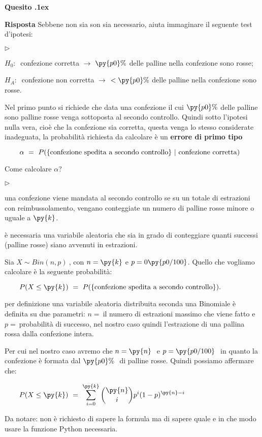 \documentclass[11pt,twoside,a4paper]{article}
\newcommand{\mylabel}[1]{#1\hfill}
\renewenvironment{itemize}
  {\begin{list}{$\triangleright$}{%
   \setlength{\parskip}{0mm}
   \setlength{\topsep}{.4\baselineskip}
   \setlength{\rightmargin}{0mm}
   \setlength{\listparindent}{0mm}
   \setlength{\itemindent}{0mm}
   \setlength{\labelwidth}{2ex}
   \setlength{\itemsep}{.4\baselineskip}
   \setlength{\parsep}{0mm}
   \setlength{\partopsep}{0mm}
   \setlength{\labelsep}{1ex}
   \setlength{\leftmargin}{\labelwidth+\labelsep}
   \let\makelabel\mylabel}}{%
   \end{list}\vspace*{-1.3mm}}
\newcounter{quesito}
\newenvironment{question}{\addtocounter{quesito}{1}\par\textbf{Quesito \thequesito.\kern1ex}}{\vspace{0.5\parskip}}
\newenvironment{answer}{\par\textbf{Risposta\quad}}{\vspace{\parskip}}
\begin{document}
\begin{question}
\begin{answer}
Sebbene non sia son sia necessario, aiuta immaginare il seguente test d'ipotesi:
\begin{itemize}
\item $H_0:\ $ confezione corretta $\rightarrow$ $\py{p0}\%$ delle palline nella confezione sono rosse;
\item $H_A:\ $ confezione non corretta $\rightarrow$ $< \py{p0}\%$ delle palline nella confezione sono rosse.
\end{itemize} 
Nel primo punto si richiede che data una confezione il cui $\py{p0} \% $ delle palline sono palline rosse  venga sottoposta al secondo controllo. Quindi sotto l'ipotesi nulla vera, cioè che la confezione sia corretta, questa venga lo stesso considerate inadeguata, la probabilità richiesta da calcolare è un \textbf{errore di primo tipo}

$\qquad
\alpha\ =\ P(\{{\rm confezione\ spedita\ a\ secondo\ controllo}\}\ | {\rm\ confezione\ corretta})
$

Come calcolare $\alpha$? 
\begin{itemize}
\item una confezione viene mandata al secondo controllo se su un totale di  estrazioni con reimbussolamento, vengano conteggiate un numero di palline rosse minore o uguale a $\py{k}$.
\item è necessaria una variabile aleatoria che sia in grado di conteggiare quanti successi (palline rosse) siano avvenuti in  estrazioni.
\item Sia $X\sim Bin(n,p)\ $, con $n=\py{k}$ e $p=0\py{p0/100}$. Quello che vogliamo calcolare è la seguente probabilità:

$\qquad
P(X\le \py{k})\ =\ P(\{\rm confezione\ spedita\ a\ secondo\ controllo\}).
$

\item per definizione una variabile aleatoria distribuita seconda una Binomiale è definita su due parametri: $n=\ $il numero di estrazioni massimo che viene fatto e $p=\ $probabilità di successo, nel nostro caso quindi l'estrazione di una pallina rossa dalla confezione intera. 
\end{itemize}
Per cui nel nostro caso avremo che $n=\py{n}\ $ e $p=\py{p0/100}\ $ in quanto la confezione è formata dal $\py{p0}\%\ $ di palline rosse. Quindi possiamo affermare che:

$\qquad\displaystyle
P(X\le \py{k})\ =\  \sum_{i=0}^{\py{k}}\binom{\py{n}}{i} p^i (1-p)^{\py{n}-i} 
$

Da notare: non è richiesto di sapere la formula ma di sapere quale e in che modo usare la funzione Python necessaria.



\end{answer}
\end{question}
\end{document}
